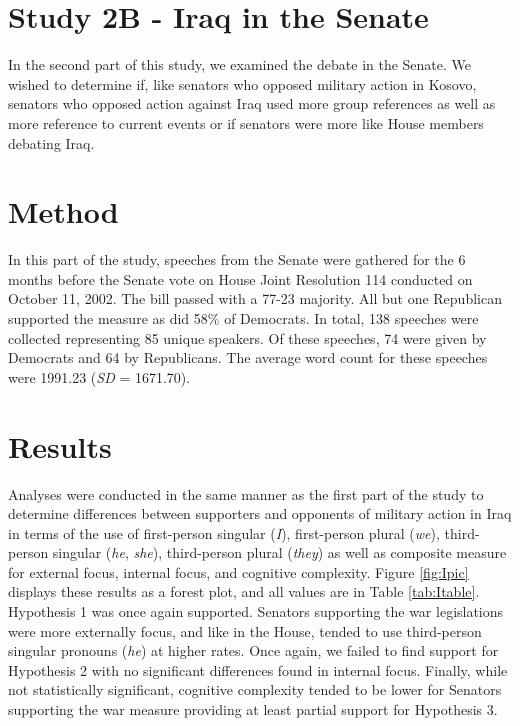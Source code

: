 \documentclass[english,,man]{apa6}
\begin{document}
\hypertarget{study-2b---iraq-in-the-senate}{%
\section{Study 2B - Iraq in the Senate}\label{study-2b---iraq-in-the-senate}}

In the second part of this study, we examined the debate in the Senate. We wished to determine if, like senators who opposed military action in Kosovo, senators who opposed action against Iraq used more group references as well as more reference to current events or if senators were more like House members debating Iraq.

\hypertarget{method-4}{%
\section{Method}\label{method-4}}

In this part of the study, speeches from the Senate were gathered for the 6 months before the Senate vote on House Joint Resolution 114 conducted on October 11, 2002. The bill passed with a 77-23 majority. All but one Republican supported the measure as did 58\% of Democrats. In total, 138 speeches were collected representing 85 unique speakers. Of these speeches, 74 were given by Democrats and 64 by Republicans. The average word count for these speeches were 1991.23 (\emph{SD} = 1671.70).

\hypertarget{results-3}{%
\section{Results}\label{results-3}}

Analyses were conducted in the same manner as the first part of the study to determine differences between supporters and opponents of military action in Iraq in terms of the use of first-person singular (\emph{I}), first-person plural (\emph{we}), third-person singular (\emph{he}, \emph{she}), third-person plural (\emph{they}) as well as composite measure for external focus, internal focus, and cognitive complexity. Figure \ref{fig:Ipic} displays these results as a forest plot, and all values are in Table \ref{tab:Itable}. Hypothesis 1 was once again supported. Senators supporting the war legislations were more externally focus, and like in the House, tended to use third-person singular pronouns (\emph{he}) at higher rates. Once again, we failed to find support for Hypothesis 2 with no significant differences found in internal focus. Finally, while not statistically significant, cognitive complexity tended to be lower for Senators supporting the war measure providing at least partial support for Hypothesis 3.
\end{document}
